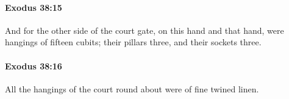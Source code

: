 		\paragraph{Exodus 38:15} %
			\label{EXODUS-38-15}

			And for the other side of the court gate, on this hand and that hand, were hangings of fifteen cubits; their pillars three, and their sockets three.


		\paragraph{Exodus 38:16} %
			\label{EXODUS-38-16}

			All the hangings of the court round about were of fine twined linen.


